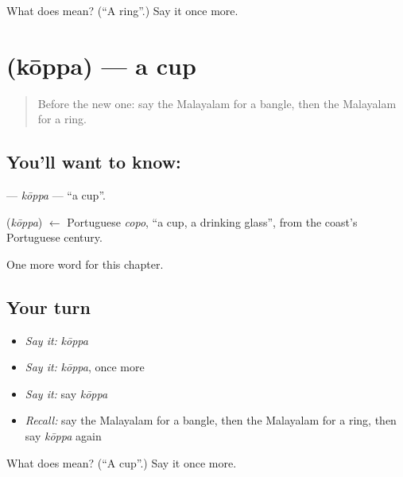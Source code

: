 \begin{tcolorbox}[breakable,colback=teal!4,colframe=teal!35!black,title={Before you move on}]
What does  mean? (\textquotedblleft{}A ring\textquotedblright{}.) Say it once more.
\end{tcolorbox}
\section[\texorpdfstring{\ml{കോപ്പ} (kōppa)}{കോപ്പ (kōppa)}]{ (kōppa) — a cup}

\label{lesson:ML-C156-koppa}



\begin{quote}
Before the new one: say the Malayalam for a bangle, then the Malayalam for a ring.
\end{quote}

\subsection*{You'll want to know: }
\textbf{} — \emph{kōppa} — \textquotedblleft{}a cup\textquotedblright{}.

\begin{cousinweb}
\textbf{} (\emph{kōppa}) $\leftarrow$ Portuguese \emph{copo}, \textquotedblleft{}a cup, a drinking glass\textquotedblright{}, from the coast's Portuguese century.
\end{cousinweb}

\begin{grammarlens}[title={What you've built}]
One more word for this chapter.
\end{grammarlens}

\subsection*{Your turn}
\begin{itemize}
\raggedright
  \item \emph{Say it:} \emph{kōppa}
  \item \emph{Say it:} \emph{kōppa}, once more
  \item \emph{Say it:} say \emph{kōppa}
  \item \emph{Recall:} say the Malayalam for a bangle, then the Malayalam for a ring, then say \emph{kōppa} again
\end{itemize}

\begin{tcolorbox}[breakable,colback=teal!4,colframe=teal!35!black,title={Before you move on}]
What does  mean? (\textquotedblleft{}A cup\textquotedblright{}.) Say it once more.
\end{tcolorbox}
